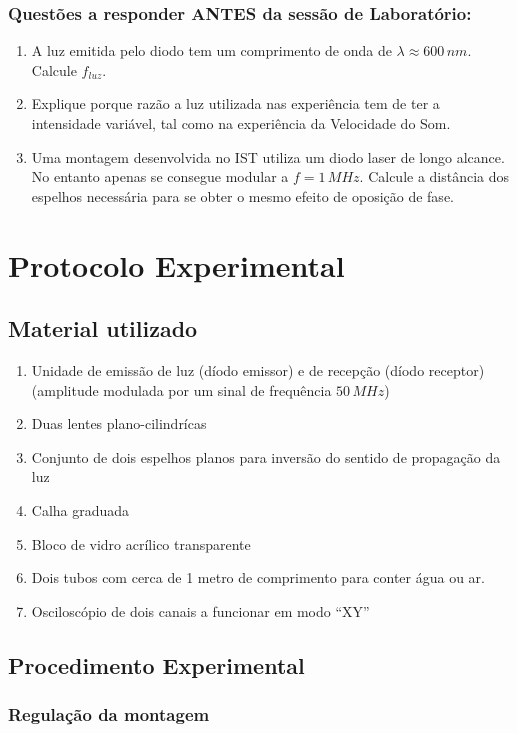 \documentclass[a4paper,12pt]{article}      %
\begin{document}
\subsubsection{\sf Questões a responder ANTES da sessão de Laboratório:}
\begin{enumerate}
\item A luz emitida pelo diodo tem um comprimento de onda de $\lambda \approx 600 \, nm$. Calcule $f_{luz}$.
\item Explique porque razão a luz utilizada nas experiência tem de ter a intensidade variável, tal como na experiência da Velocidade do Som.
\item Uma montagem desenvolvida no IST utiliza um diodo laser de longo alcance. No entanto apenas se consegue modular a $f=1\, MHz$. Calcule a distância
dos espelhos necessária para se obter o mesmo efeito de oposição de fase.
\end{enumerate}

\newpage
\section{\sf Protocolo Experimental}
\subsection{\sf Material utilizado}

\begin{enumerate}
\setlength{\itemsep}{0mm}
\item Unidade de emissão de luz (díodo emissor) e de recepção (díodo receptor)
(amplitude modulada por um sinal de frequência $50\,MHz$)
\item Duas lentes plano-cilindrícas
\item Conjunto de dois espelhos planos para inversão do sentido de propagação da luz 
\item Calha graduada  
\item Bloco de vidro acrílico transparente 
\item Dois tubos com cerca de 1 metro de comprimento para conter água ou ar. 
\item Osciloscópio de dois canais a funcionar em modo “XY”
\end{enumerate}

\subsection{\sf Procedimento Experimental}
\subsubsection{\sf Regulação da montagem}
 
\end{document}
